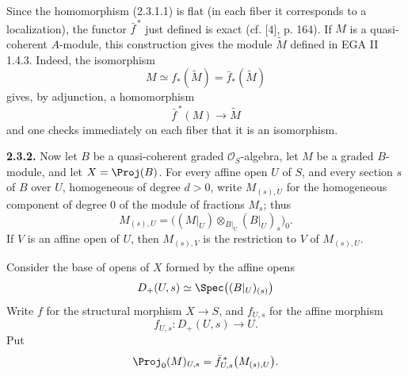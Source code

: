 Since the homomorphism (2.3.1.1) is flat (in each fiber it corresponds to a localization), the functor \(\bar f^{\,*}\) just defined is exact (cf. [4], p. 164). If \(M\) is a quasi-coherent \(A\)-module, this construction gives the module \(\widetilde M\) defined in EGA II 1.4.3. Indeed, the isomorphism
\[
  M\simeq f_*(\widetilde M)=\bar f_*(\widetilde M)
\]
gives, by adjunction, a homomorphism
\[
  \bar f^{\,*}(M)\longrightarrow \widetilde M
\]
and one checks immediately on each fiber that it is an isomorphism.

\textbf{2.3.2.} Now let \(B\) be a quasi-coherent graded \(\mathcal O_S\)-algebra, let \(M\) be a graded \(B\)-module, and let \(X=\Proj(B)\). For every affine open \(U\) of \(S\), and every section \(s\) of \(B\) over \(U\), homogeneous of degree \(d>0\), write \(M_{(s),U}\) for the homogeneous component of degree \(0\) of the module of fractions \(M_s\); thus
\[
  M_{(s),U}=
  \bigl((M|_U)\otimes_{B|_U}(B|_U)_s\bigr)_0 .
\]
If \(V\) is an affine open of \(U\), then \(M_{(s),V}\) is the restriction to \(V\) of \(M_{(s),U}\).

Consider the base of opens of \(X\) formed by the affine opens
\[
  D_+(U,s)\simeq \Spec\bigl((B|_U)_{(s)}\bigr)
\]
Write \(f\) for the structural morphism \(X\to S\), and \(f_{U,s}\) for the affine morphism
\[
  f_{U,s}:D_+(U,s)\longrightarrow U .
\]
Put
\[
  \Proj_0(M)_{U,s}
  =
  \bar f_{U,s}^{\,*}\bigl(M_{(s),U}\bigr).
\]

